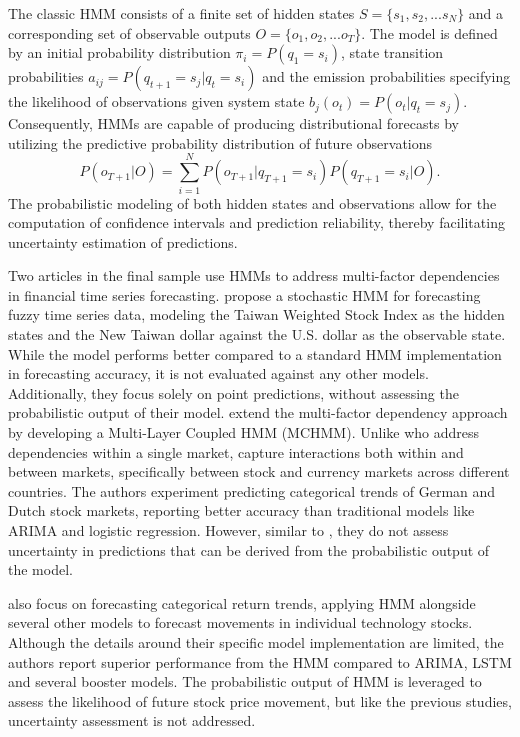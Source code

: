 The classic HMM consists of a finite set of hidden states $S = \{s_1, s_2, ... s_N\}$ and a corresponding set of observable outputs $O = \{o_1, o_2, ... o_T\}$. The model is defined by an initial probability distribution $\pi_i = P(q_1 = s_i)$, state transition probabilities $a_{ij} = P(q_{t+1} = s_j|q_t = s_i)$ and the emission probabilities specifying the likelihood of observations given system state $b_j(o_t) = P(o_t|q_t=s_j)$. Consequently, HMMs are capable of producing distributional forecasts by utilizing the predictive probability distribution of future observations
\begin{equation}
        P(o_{T+1}|O) = \sum_{i=1}^{N}P(o_{T+1}|q_{T+1} = s_i)P(q_{T+1} = s_i | O).
\end{equation}
The probabilistic modeling of both hidden states and observations allow for the computation of confidence intervals and prediction reliability, thereby facilitating uncertainty estimation of predictions. 

Two articles in the final sample use HMMs to address multi-factor dependencies in financial time series forecasting. \textcite{li2010stochastic} propose a stochastic HMM for forecasting fuzzy time series data, modeling the Taiwan Weighted Stock Index as the hidden states and the New Taiwan dollar against the U.S. dollar as the observable state. While the model performs better compared to a standard HMM implementation in forecasting accuracy, it is not evaluated against any other models. Additionally, they focus solely on point predictions, without assessing the probabilistic output of their model. \textcite{cao2019multi} extend the multi-factor dependency approach by developing a Multi-Layer Coupled HMM (MCHMM). Unlike \textcite{li2010stochastic} who address dependencies within a single market, \textcite{cao2019multi} capture interactions both within and between markets, specifically between stock and currency markets across different countries. The authors experiment predicting categorical trends of German and Dutch stock markets, reporting better accuracy than traditional models like ARIMA and logistic regression. However, similar to \textcite{li2010stochastic}, they  do not assess uncertainty in predictions that can be derived from the probabilistic output of the model. 

\textcite{sher2023exploiting} also focus on forecasting categorical return trends, applying HMM alongside several other models to forecast movements in individual technology stocks. Although the details around their specific model implementation are limited, the authors report superior performance from the HMM compared to ARIMA, LSTM and several booster models. The probabilistic output of HMM is leveraged to assess the likelihood of future stock price movement, but like the previous studies, uncertainty assessment is not addressed. 

